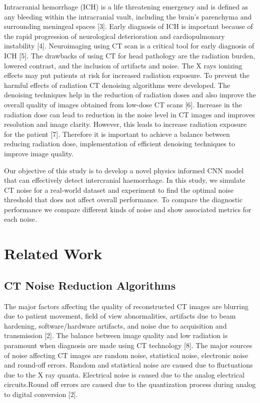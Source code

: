 \documentclass{article}
\begin{document}
\begin{par}
    Intracranial hemorrhage (ICH) is a life threatening emergency and is defined as any bleeding within the intracranial vault, including the brain's parenchyma and surrounding meningeal spaces [3]. 
    Early diagnosis of ICH is important because of the rapid progression of neurological deterioration and cardiopulmonary instability [4]. Neuroimaging using CT scan is a critical tool for early diagnosis of ICH [5]. The drawbacks of using CT for head pathology are the radiation burden, lowered contrast, and the inclusion of artifacts and noise. The X rays ionizing effects may put patients at risk for increased radiation exposure. To prevent the harmful effects of radiation CT denoising algorithms were developed. The denoising techniques help in the reduction of radiation doses and also improve the overall  quality of images obtained from low-dose CT scans [6]. Increase in the radiation dose can lead to reduction in the noise level in CT images and improves resolution and image clarity. However, this leads to increase radiation exposure for the patient [7]. Therefore it is  important to achieve a balance between reducing radiation dose, implementation of efficient denoising techniques to improve image quality.
\end{par}

\begin{par}
    Our objective of this study is to develop a novel physics informed CNN model that can effectively detect intercranial haemorrhage. In this study, we simulate CT noise for a real-world dataset and experiment to find the optimal noise threshold that does not affect overall performance. To compare the diagnostic performance we compare different kinds of noise and show associated metrics for each noise. 
\end{par}

\section{Related Work}

\subsection{CT Noise Reduction Algorithms}

\begin{par}
    The major factors affecting the quality of reconstructed CT images are blurring due to patient movement, field of view abnormalities, artifacts due to beam hardening, software/hardware artifacts, and noise due to acquisition and transmission [2]. The balance between image quality and low radiation is paramount when diagnosis are made using CT technology [8]. The major sources of noise affecting CT images are random noise, statistical noise, electronic noise and round-off errors. Random and statistical noise are caused due to fluctuations due to the X ray quanta. Electrical noise is caused due to the analog electrical circuits.Round off errors are caused due to the quantization process during analog to digital conversion [2].
\end{par}
\end{document}
